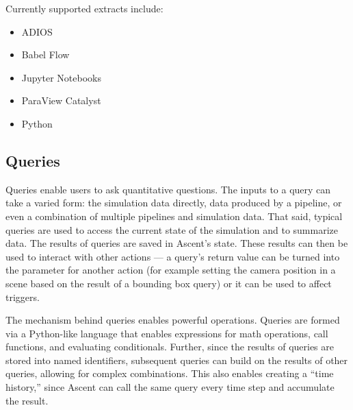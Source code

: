 Currently supported extracts include:
\begin{itemize}
\item ADIOS
\item Babel Flow~\cite{babelflow}
\item Jupyter Notebooks
\item ParaView Catalyst
\item Python
\end{itemize}

\subsection{Queries}
\label{action_queries}
Queries enable users to ask quantitative questions.
%
The inputs to a query can take a varied form:
the simulation data directly,
data produced by a pipeline,
or even a combination of multiple pipelines and simulation data.
%
That said, typical queries are used to access the current state of the simulation
and to summarize data.
%
The results of queries are saved in Ascent's state.
%
These results can then be used to
interact with other actions --- a query's return value can be turned
into the parameter for another action (for example setting the camera position in a scene based
on the result of a bounding box query) or it can be used to affect triggers.
%

The mechanism behind queries enables powerful operations.
%
Queries are formed via a Python-like language that
enables expressions for math operations,
call functions, and evaluating conditionals.
%
Further, since the results of queries are stored into named identifiers, subsequent queries
can build on the results of other queries, allowing for complex combinations.
%
%
This also enables creating a ``time history,'' since
Ascent can call the same query every time step and accumulate the result.


%
%

